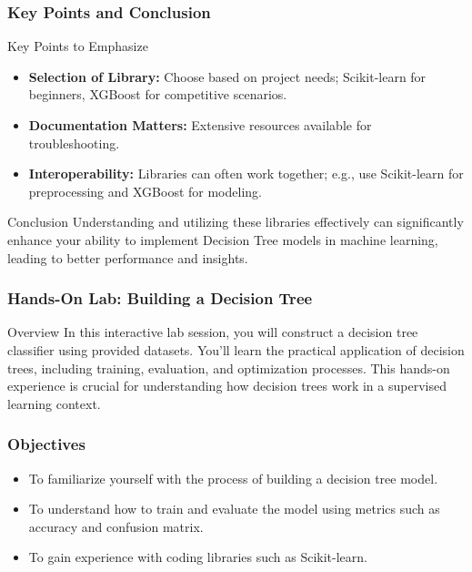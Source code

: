 \documentclass[aspectratio=169]{beamer}
\begin{document}
\begin{frame}[fragile]
    \frametitle{Key Points and Conclusion}
    \begin{block}{Key Points to Emphasize}
        \begin{itemize}
            \item \textbf{Selection of Library:} Choose based on project needs; Scikit-learn for beginners, XGBoost for competitive scenarios.
            \item \textbf{Documentation Matters:} Extensive resources available for troubleshooting.
            \item \textbf{Interoperability:} Libraries can often work together; e.g., use Scikit-learn for preprocessing and XGBoost for modeling.
        \end{itemize}
    \end{block}

    \begin{block}{Conclusion}
        Understanding and utilizing these libraries effectively can significantly enhance your ability to implement Decision Tree models in machine learning, leading to better performance and insights.
    \end{block}
\end{frame}

\begin{frame}
    \frametitle{Hands-On Lab: Building a Decision Tree}
    \begin{block}{Overview}
        In this interactive lab session, you will construct a decision tree classifier using provided datasets. You'll learn the practical application of decision trees, including training, evaluation, and optimization processes. This hands-on experience is crucial for understanding how decision trees work in a supervised learning context.
    \end{block}
\end{frame}

\begin{frame}
    \frametitle{Objectives}
    \begin{itemize}
        \item To familiarize yourself with the process of building a decision tree model.
        \item To understand how to train and evaluate the model using metrics such as accuracy and confusion matrix.
        \item To gain experience with coding libraries such as Scikit-learn.
    \end{itemize}
\end{frame}
\end{document}
